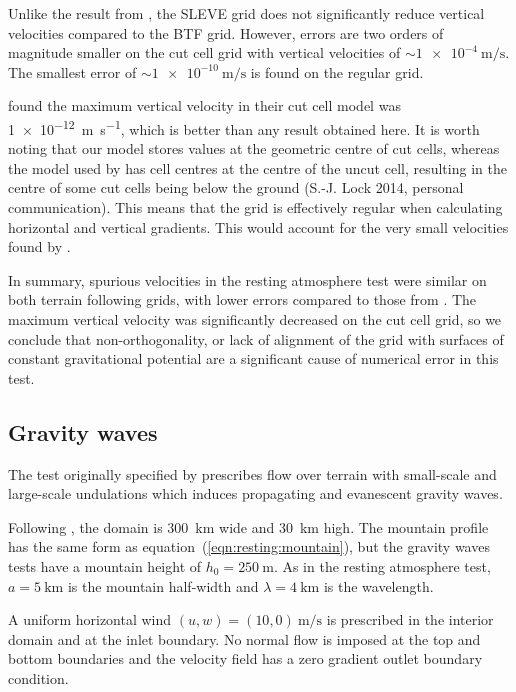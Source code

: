 \documentclass{ametsoc}
\begin{document}
Unlike the result from \citet{klemp2011}, the SLEVE grid does not significantly reduce vertical velocities compared to the BTF grid.  However, errors are two orders of magnitude smaller on the cut cell grid with vertical velocities of \(\sim \SI{1e-4}{\meter\per\second}\).  The smallest error of \(\sim \SI{1e-10}{\meter\per\second}\) is found on the regular grid.

\citet{good2014} found the maximum vertical velocity in their cut cell model was \SI{1e-12}{\meter\per\second}, which is better than any result obtained here.  It is worth noting that our model stores values at the geometric centre of cut cells, whereas the model used by \citet{good2014} has cell centres at the centre of the uncut cell, resulting in the centre of some cut cells being below the ground (S.-J. Lock 2014, personal communication).  This means that the grid is effectively regular when calculating horizontal and vertical gradients.  This would account for the very small velocities found by \citet{good2014}.

In summary, spurious velocities in the resting atmosphere test were similar on both terrain following grids, with lower errors compared to those from \citet{klemp2011}.  The maximum vertical velocity was significantly decreased on the cut cell grid, so we conclude that non-orthogonality, or lack of alignment of the grid with surfaces of constant gravitational potential are a significant cause of numerical error in this test.


\subsection{Gravity waves}
\label{sec:gw}
The test originally specified by \citet{schaer2002} prescribes flow over terrain with small-scale and large-scale undulations which induces propagating and evanescent gravity waves.

Following \citet{melvin2010}, the domain is \SI{300}{\kilo\meter} wide and \SI{30}{\kilo\meter} high.
The mountain profile has the same form as equation~(\ref{eqn:resting:mountain}), but the gravity waves tests have a mountain height of $h_0 = \SI{250}{\meter}$.  As in the resting atmosphere test, $a = \SI{5}{\kilo\meter}$ is the mountain half-width and $\lambda = \SI{4}{\kilo\meter}$ is the wavelength.

A uniform horizontal wind $(u, w) = (10, 0)\:\si{\meter\per\second}$ is prescribed in the interior domain and at the inlet boundary.  No normal flow is imposed at the top and bottom boundaries and the velocity field has a zero gradient outlet boundary condition.
\end{document}
